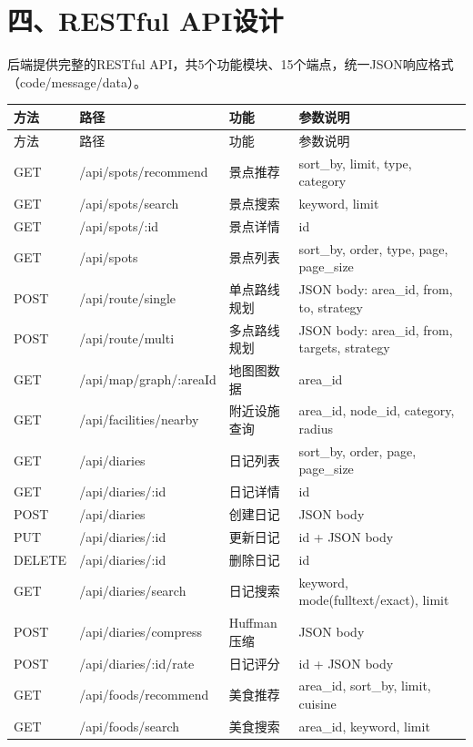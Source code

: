 \documentclass[12pt,a4paper]{article}
\begin{document}
\section*{四、RESTful API设计}

后端提供完整的RESTful API，共5个功能模块、15个端点，统一JSON响应格式（code/message/data）。

\begin{center}
\begin{longtable}{l l l p{5cm}}
    \toprule
    方法 & 路径 & 功能 & 参数说明 \\
    \midrule
    \endfirsthead
    \toprule
    方法 & 路径 & 功能 & 参数说明 \\
    \midrule
    \endhead
    \bottomrule
    \endlastfoot

    GET  & /api/spots/recommend & 景点推荐 & sort\_by, limit, type, category \\
    GET  & /api/spots/search    & 景点搜索 & keyword, limit \\
    GET  & /api/spots/:id       & 景点详情 & id \\
    GET  & /api/spots           & 景点列表 & sort\_by, order, type, page, page\_size \\

    POST & /api/route/single    & 单点路线规划 & JSON body: area\_id, from, to, strategy \\
    POST & /api/route/multi     & 多点路线规划 & JSON body: area\_id, from, targets, strategy \\
    GET  & /api/map/graph/:areaId & 地图图数据 & area\_id \\

    GET  & /api/facilities/nearby & 附近设施查询 & area\_id, node\_id, category, radius \\

    GET  & /api/diaries         & 日记列表 & sort\_by, order, page, page\_size \\
    GET  & /api/diaries/:id     & 日记详情 & id \\
    POST & /api/diaries         & 创建日记 & JSON body \\
    PUT  & /api/diaries/:id     & 更新日记 & id + JSON body \\
    DELETE & /api/diaries/:id   & 删除日记 & id \\
    GET  & /api/diaries/search  & 日记搜索 & keyword, mode(fulltext/exact), limit \\
    POST & /api/diaries/compress & Huffman压缩 & JSON body \\
    POST & /api/diaries/:id/rate & 日记评分 & id + JSON body \\

    GET  & /api/foods/recommend & 美食推荐 & area\_id, sort\_by, limit, cuisine \\
    GET  & /api/foods/search    & 美食搜索 & area\_id, keyword, limit \\
\end{longtable}
\end{center}
\end{document}
